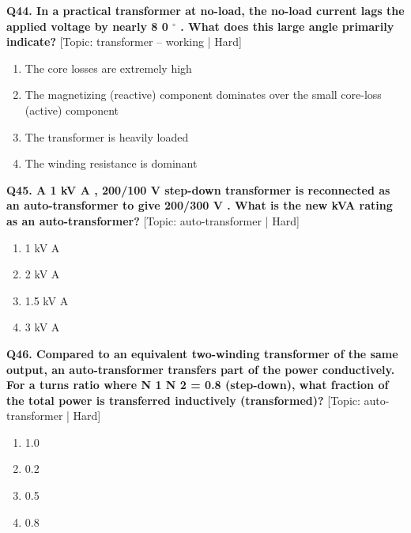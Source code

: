 \noindent\textbf{Q44. In a practical transformer at no-load, the no-load current lags the applied voltage by nearly 8 0 $^\circ$ . What does this large angle primarily indicate?} \hfill [Topic: transformer -- working | Hard]
\begin{enumerate}[label=(\alph*),topsep=2pt,itemsep=1pt,partopsep=0pt,parsep=0pt]
    \item {The core losses are extremely high}
    \item {The magnetizing (reactive) component dominates over the small core-loss (active) component}
    \item {The transformer is heavily loaded}
    \item {The winding resistance is dominant}
\end{enumerate}
\vspace{2mm}

\noindent\textbf{Q45. A 1 kV A , 200/100 V step-down transformer is reconnected as an auto-transformer to give 200/300 V . What is the new kVA rating as an auto-transformer?} \hfill [Topic: auto-transformer | Hard]
\begin{enumerate}[label=(\alph*),topsep=2pt,itemsep=1pt,partopsep=0pt,parsep=0pt]
    \item {1 kV A}
    \item {2 kV A}
    \item {1.5 kV A}
    \item {3 kV A}
\end{enumerate}
\vspace{2mm}

\noindent\textbf{Q46. Compared to an equivalent two-winding transformer of the same output, an auto-transformer transfers part of the power conductively. For a turns ratio where N 1 N 2 = 0.8 (step-down), what fraction of the total power is transferred inductively (transformed)?} \hfill [Topic: auto-transformer | Hard]
\begin{enumerate}[label=(\alph*),topsep=2pt,itemsep=1pt,partopsep=0pt,parsep=0pt]
    \item {1.0}
    \item {0.2}
    \item {0.5}
    \item {0.8}
\end{enumerate}
\vspace{2mm}

